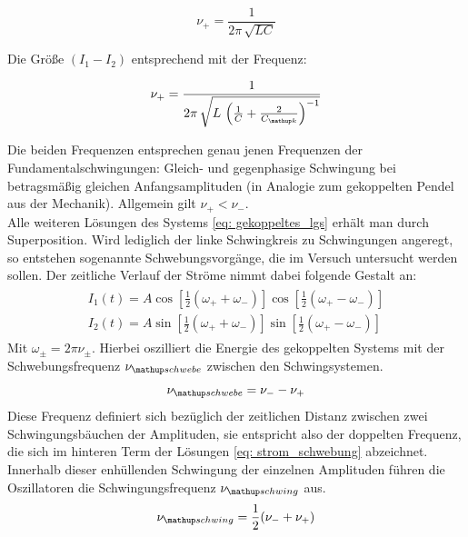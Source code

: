 \begin{equation}
  \nu_+ = \frac{1}{2\pi \, \sqrt{LC}}
  \label{eq: nu+}
\end{equation}

Die Größe $\left( I_1 - I_2 \right)$ entsprechend mit der Frequenz:

\begin{equation}
\nu_+ = \frac{1}{2\pi \, \sqrt{L\, \left(\frac{1}{C} + \frac{2}{C\ua{k}}\right)^{-1}}}
\label{eq: nu-}
\end{equation}

Die beiden Frequenzen entsprechen genau jenen Frequenzen der Fundamentalschwingungen: Gleich- und gegenphasige Schwingung bei
betragsmäßig gleichen Anfangsamplituden (in Analogie zum gekoppelten Pendel aus der Mechanik). Allgemein gilt $\nu_+ < \nu_-$.\\
Alle weiteren Lösungen des Systems \eqref{eq: gekoppeltes_lgs} erhält man durch Superposition. Wird lediglich der linke Schwingkreis zu Schwingungen
angeregt, so entstehen sogenannte Schwebungsvorgänge, die im Versuch untersucht werden sollen. Der zeitliche Verlauf der Ströme nimmt dabei folgende
Gestalt an:
  \begin{align}
  \begin{aligned}
    I_1(t) = A \cos\left[\frac{1}{2}(\omega_+ + \omega_-) \right]\cos\left[\frac{1}{2}(\omega_+ - \omega_-) \right] \\
    I_2(t) = A \sin\left[\frac{1}{2}(\omega_+ + \omega_-) \right]\sin\left[\frac{1}{2}(\omega_+ - \omega_-) \right]
    \label{eq: strom_schwebung}
  \end{aligned}
  \end{align}
Mit $\omega_{\pm} = 2\pi \nu_{\pm}$. Hierbei oszilliert die Energie des gekoppelten Systems
mit der Schwebungsfrequenz $\nu\ua{schwebe}$ zwischen den Schwingsystemen.
\begin{equation}
  \nu\ua{schwebe} = \nu_- - \nu_+
  \label{eq: nu_schwebe}
\end{equation}
Diese Frequenz definiert sich bezüglich der zeitlichen Distanz zwischen zwei Schwingungsbäuchen der Amplituden, sie entspricht also
der doppelten Frequenz, die sich im hinteren Term der Lösungen \eqref{eq: strom_schwebung} abzeichnet.
Innerhalb dieser enhüllenden Schwingung der einzelnen Amplituden führen die Oszillatoren die Schwingungsfrequenz $\nu\ua{schwing}$ aus.
\begin{equation}
  \nu\ua{schwing} =  \frac{1}{2}(\nu_- + \nu_+)
  \label{eq: nu_schwing}
\end{equation}\par
